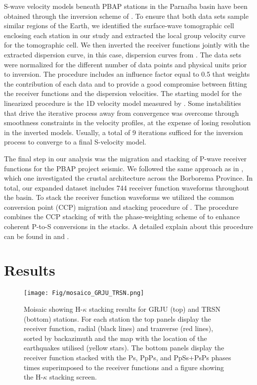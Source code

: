 \documentclass[paper,11pt]{geophysics}
\begin{document}
S-wave velocity models beneath PBAP stations in the Parnaíba basin have been obtained through the inversion scheme of \cite{julia_joint_2000}. To ensure that both data sets sample similar regions of the Earth, we identified the surface-wave tomographic cell enclosing each station in our study and extracted the local group velocity curve for the tomographic cell. We then inverted the receiver functions jointly with the extracted dispersion curve, in this case, dispersion curves from \cite{feng_upper_2007}. The data sets were normalized for the different number of data points and physical units prior to inversion. The procedure includes an influence factor equal to 0.5 that weights the contribution of each data and to provide a good compromise between fitting the receiver functions and the dispersion velocities. The starting model for the linearized procedure is the 1D velocity model measured by \cite{almeida_crustal_2015}. Some instabilities that drive the iterative process away from convergence was overcome through smoothness constraints in the velocity profiles, at the expense of losing resolution in the inverted models. Usually, a total of 9 iterations sufficed for the inversion process to converge to a final S-velocity model.

The final step in our analysis was the migration and stacking of P-wave receiver functions for the PBAP project seismic. We followed the same approach as in \cite{almeida_crustal_2015}, which one investigated the crustal architecture across the
Borborema Province. In total, our expanded dataset includes 744 receiver function waveforms throughout the basin. To stack the receiver function waveforms we utilized the common conversion point (CCP) migration and stacking procedure of \cite{frassetto_improved_2010}. The procedure combines the CCP stacking of \cite{gilbert_images_2004} with the phase-weighting scheme of \cite{schimmel_noise_1997} to enhance coherent P-to-S conversions in the stacks. A detailed explain about this
procedure can be found in \cite{frasseto_receiver_2013} and \cite{almeida_crustal_2015}.

\section{Results}

\begin{figure}[!ht]
\centering
\texttt{[image: Fig/mosaico\_GRJU\_TRSN.png]}
\caption{Moisaic showing H-$\kappa$ stacking results for GRJU (top) and TRSN (bottom) stations. For each station the top panels display the receiver function, radial (black lines) and tranverse (red lines), sorted by backazimuth and the map with the location of the earthquakes utilised (yellow stars). The bottom panels display the receiver function stacked with the Ps, PpPs, and PpSs+PsPs phases times superimposed to the receiver functions and a figure showing the H-$\kappa$ stacking screen.}
\label{moisaic_FR}
\end{figure}
\end{document}

